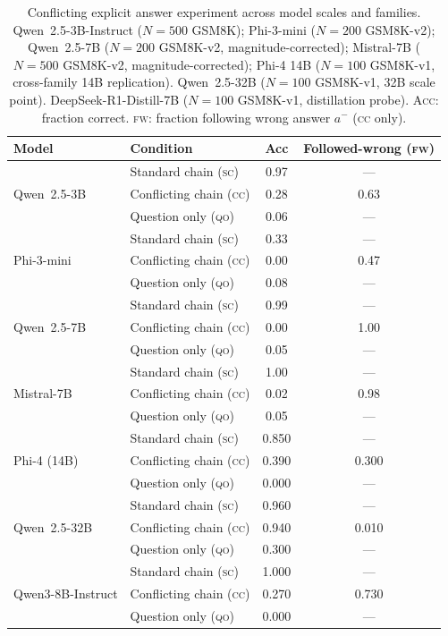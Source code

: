 \documentclass{article}
\theoremstyle{definition}
\theoremstyle{definition}
\newcommand{\SCACC}{0.97}
\newcommand{\CCACC}{0.28}
\newcommand{\CCFW}{0.63}
\newcommand{\QOACC}{0.06}
\newcommand{\PHISCACC}{0.33}
\newcommand{\PHICCACC}{0.00}
\newcommand{\PHICCFW}{0.47}
\newcommand{\PHIQOACC}{0.08}
\newcommand{\SBSCACC}{0.99}
\newcommand{\SBCCACC}{0.00}
\newcommand{\SBCCFW}{1.00}
\newcommand{\SBQOACC}{0.05}
\newcommand{\SBN}{200}
\newcommand{\MISTSCACC}{1.00}
\newcommand{\MISTCCACC}{0.02}
\newcommand{\MISTCCFW}{0.98}
\newcommand{\MISTQOACC}{0.05}
\newcommand{\MISTN}{500}
\newcommand{\PHIFOURSCACC}{0.850}
\newcommand{\PHIFOURCCACC}{0.390}
\newcommand{\PHIFOURCCFW}{0.300}
\newcommand{\PHIFOURQOACC}{0.000}
\newcommand{\PHIFOURN}{100}
\newcommand{\QWTBSCACC}{0.960}
\newcommand{\QWTBCCACC}{0.940}
\newcommand{\QWTBCCFW}{0.010}
\newcommand{\QWTBQOACC}{0.300}
\newcommand{\QWTBN}{100}
\newcommand{\QTHREESCACC}{1.000}
\newcommand{\QTHREECCACC}{0.270}
\newcommand{\QTHREECCFW}{0.730}
\newcommand{\QTHREEQOACC}{0.000}
\newcommand{\DSN}{100}
\begin{document}
\begin{table}[h]
\centering
\caption{Conflicting explicit answer experiment across model scales and families.
  Qwen~2.5-3B-Instruct ($N{=}500$ GSM8K);
  Phi-3-mini ($N{=}200$ GSM8K-v2);
  Qwen~2.5-7B ($N{=}\SBN$ GSM8K-v2, magnitude-corrected);
  Mistral-7B ($N{=}\MISTN$ GSM8K-v2, magnitude-corrected);
  Phi-4 14B ($N{=}\PHIFOURN$ GSM8K-v1, cross-family 14B replication).
  Qwen~2.5-32B ($N{=}\QWTBN$ GSM8K-v1, 32B scale point).  DeepSeek-R1-Distill-7B ($N{=}\DSN$ GSM8K-v1, distillation probe).
  \textsc{Acc}: fraction correct.
  \textsc{fw}: fraction following wrong answer $a^-$ (\textsc{cc} only).}
\label{tab:conflicting}
\begin{tabular}{llcc}
\toprule
Model & Condition & Acc & Followed-wrong (\textsc{fw}) \\
\midrule
\multirow{3}{*}{Qwen~2.5-3B}
  & Standard chain (\textsc{sc})    & \SCACC  & --- \\
  & Conflicting chain (\textsc{cc}) & \CCACC  & \CCFW \\
  & Question only (\textsc{qo})     & \QOACC  & --- \\
\midrule
\multirow{3}{*}{Phi-3-mini}
  & Standard chain (\textsc{sc})    & \PHISCACC  & --- \\
  & Conflicting chain (\textsc{cc}) & \PHICCACC  & \PHICCFW \\
  & Question only (\textsc{qo})     & \PHIQOACC  & --- \\
\midrule
\multirow{3}{*}{Qwen~2.5-7B}
  & Standard chain (\textsc{sc})    & \SBSCACC  & --- \\
  & Conflicting chain (\textsc{cc}) & \SBCCACC  & \SBCCFW \\
  & Question only (\textsc{qo})     & \SBQOACC  & --- \\
\midrule
\multirow{3}{*}{Mistral-7B}
  & Standard chain (\textsc{sc})    & \MISTSCACC  & --- \\
  & Conflicting chain (\textsc{cc}) & \MISTCCACC  & \MISTCCFW \\
  & Question only (\textsc{qo})     & \MISTQOACC  & --- \\
\midrule
\multirow{3}{*}{Phi-4 (14B)}
  & Standard chain (\textsc{sc})    & \PHIFOURSCACC  & --- \\
  & Conflicting chain (\textsc{cc}) & \PHIFOURCCACC  & \PHIFOURCCFW \\
  & Question only (\textsc{qo})     & \PHIFOURQOACC  & --- \\
\midrule
\multirow{3}{*}{Qwen~2.5-32B}
  & Standard chain (\textsc{sc})    & \QWTBSCACC  & --- \\
  & Conflicting chain (\textsc{cc}) & \QWTBCCACC  & \QWTBCCFW \\
  & Question only (\textsc{qo})     & \QWTBQOACC  & --- \\
\midrule
\multirow{3}{*}{Qwen3-8B-Instruct}
  & Standard chain (\textsc{sc})    & \QTHREESCACC  & --- \\
  & Conflicting chain (\textsc{cc}) & \QTHREECCACC  & \QTHREECCFW \\
  & Question only (\textsc{qo})     & \QTHREEQOACC  & --- \\


\end{tabular}
\end{table}
\end{document}
